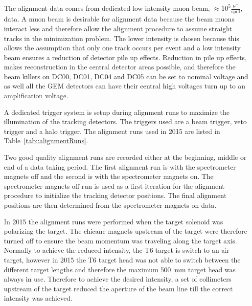 The alignment data comes from dedicated low intensity muon beam, $\approx 10^5
\frac{\mu ^-}{\mathrm{spill}}$, data.  A muon beam is desirable for alignment
data because the beam muons interact less and therefore allow the alignment
procedure to assume straight tracks in the minimization problem.  The lower
intensity is chosen because this allows the assumption that only one track
occurs per event and a low intensity beam ensures a reduction of detector pile
up effects.  Reduction in pile up effects, makes reconstruction in the central
detector areas possible, and therefore the beam killers on DC00, DC01, DC04 and
DC05 can be set to nominal voltage and as well all the GEM detectors can
have their central high voltages turn up to an amplification voltage.

A dedicated trigger system is setup during alignment runs to maximize the
illumination of the tracking detectors.  The triggers used are a beam trigger,
veto trigger and a halo trigger.  The alignment runs used in 2015 are listed in
Table~\ref{tab::alignmentRuns}. \par

Two good quality alignment runs are recorded either at the beginning, middle or
end of a data taking period.  The first alignment run is with the spectrometer
magnets off and the second is with the spectrometer magnets on.  The
spectrometer magnets off run is used as a first iteration for the alignment
procedure to initialize the tracking detector positions.  The final alignment
positions are then determined from the spectrometer magnets on data.

In 2015 the alignment runs were performed when the target solenoid was
polarizing the target.  The chicane magnets upstream of the target were
therefore turned off to ensure the beam momentum was traveling along the target
axis.  Normally to achieve the reduced intensity, the T6 target is switch to an
air target, however in 2015 the T6 target head was not able to switch between
the different target lengths and therefore the maximum 500~mm target head was
always in use.  Therefore to achieve the desired intensity, a set of collimeters
upstream of the target reduced the aperture of the beam line till the correct
intensity was achieved.

